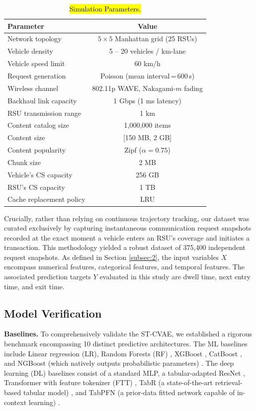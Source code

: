 \documentclass[journal]{IEEEtran}
\begin{document}
\begin{table}[ht]\centering
    \caption{\hl{Simulation Parameters.}}
    \begin{tabular}{lc}
        \hline
        \textbf{Parameter} & \textbf{Value} \\
        \hline
        Network topology & $5 \times 5$ Manhattan grid (25 RSUs) \\
        Vehicle density & 5 -- 20 vehicles / km-lane \\
        Vehicle speed limit & 60 km/h \\
        Request generation & Poisson (mean interval\,=\,600\,s) \\
        Wireless channel & 802.11p WAVE, Nakagami-$m$ fading \\
        Backhaul link capacity & 1 Gbps (1 ms latency) \\
        RSU transmission range & 1 km \\
        Content catalog size & 1,000,000 items \\
        Content size & [150 MB, 2 GB] \\
        Content popularity & Zipf ($\alpha=0.75$) \\
        Chunk size & 2 MB \\
        Vehicle's CS capacity & 256 GB \\
        RSU's CS capacity & 1 TB \\
        Cache replacement policy & LRU \\
        \hline
    \end{tabular}
    \label{table1}
\end{table}

Crucially, rather than relying on continuous trajectory tracking, our dataset was curated exclusively by capturing instantaneous communication request snapshots recorded at the exact moment a vehicle enters an RSU’s coverage and initiates a transaction.
This methodology yielded a robust dataset of 375,400 independent request snapshots.
As defined in Section \ref{subsec:2}, the input variables $X$ encompass numerical features, categorical features, and temporal features.
The associated prediction targets $Y$ evaluated in this study are dwell time, next entry time, and exit time.

\subsection{Model Verification} \label{sec.s1}
\textbf{Baselines.}
To comprehensively validate the ST-CVAE, we established a rigorous benchmark encompassing 10 distinct predictive architectures.
The ML baselines include Linear regression (LR), Random Forests (RF) \cite{x2}, XGBoost \cite{x3}, CatBoost \cite{x4}, and NGBoost (which natively outputs probabilistic parameters) \cite{x5}. The deep learning (DL) baselines consist of a standard MLP, a tabular-adapted ResNet \cite{x6}, Transformer with feature tokenizer (FTT) \cite{x6}, TabR (a state-of-the-art retrieval-based tabular model) \cite{x7}, and TabPFN (a prior-data fitted network capable of in-context learning) \cite{x8}.
\end{document}
